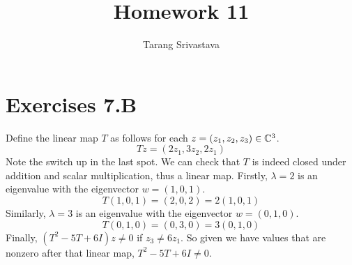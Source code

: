 \documentclass[10pt, twocolumn]{article}
\title{Homework 11}
\author{Tarang Srivastava}
\begin{document}
\makechaptertitle

\section{Exercises 7.B}

\begin{q}[3]
    Define the linear map $ T $ as follows for each $ z = (z_1, z_2, z_3) \in \mathbb{C}^3 $.
    $$ Tz = (2z_1, 3z_2, 2z_1) $$
    Note the switch up in the last spot. 
    We can check that $ T $ is indeed closed under addition and scalar multiplication, thus a linear map.
    Firstly, $ \lambda = 2 $ is an eigenvalue with the eigenvector $ w = (1, 0, 1) $.
    $$ T(1, 0, 1) = (2, 0, 2) = 2(1, 0, 1) $$
    Similarly, $ \lambda = 3 $ is an eigenvalue with the eigenvector $ w = (0, 1, 0) $.
    $$ T(0, 1, 0) = (0, 3, 0) = 3(0, 1, 0) $$
    Finally, $ (T^2 - 5T + 6I)z \neq 0 $ if $ z_3 \neq 6 z_1 $. 
    So given we have values that are nonzero after that linear map, $ T^2 - 5T + 6I \neq 0 $.
\end{q}

\begin{q}[4]

\end{q}
\end{document}
